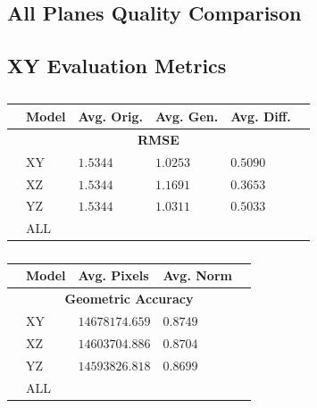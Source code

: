 \documentclass[12pt, fleqn, titlepage]{article}
\begin{document}
\subsection{All Planes Quality Comparison}\label{all_generated}


\subsection{XY Evaluation Metrics}
\begin{table}[H]
	\begin{center}
		\begin{tabular}{l l l l l l}
			\toprule
			& \textbf{Model} & \textbf{Avg. Orig.} & \textbf{Avg. Gen.} & \textbf{Avg. Diff.} & \\ \midrule
			&                        \multicolumn{4}{c}{\textbf{RMSE}}                          & \\
			&XY                & $1.5344$            & $1.0253$           & $0.5090$            & \\
			&XZ                & $1.5344$            & $1.1691$           & $0.3653$            & \\
			&YZ                & $1.5344$            & $1.0311$           & $0.5033$                    & \\
			&ALL               &                     &                    &                     & \\
			 \bottomrule
		\end{tabular}
		\caption{}
		\label{tab:metrics}
	\end{center}
\end{table}

\begin{table}[H]
	\begin{center}
		\begin{tabular}{l l l l l}
			\toprule
			& \textbf{Model}   & \textbf{Avg. Pixels} & \textbf{Avg. Norm}  & \\ \midrule
			&      \multicolumn{3}{c}{\textbf{Geometric Accuracy}}          & \\
			&XY                & $14678174.659$       & $0.8749$            & \\
			&XZ                & $14603704.886$       & $0.8704$            & \\
			&YZ                & $14593826.818$       & $0.8699$            & \\
			&ALL               &                      &                     & \\
			\bottomrule
		\end{tabular}
		\caption{}
		\label{tab:metrics}
	\end{center}
\end{table}
\end{document}
